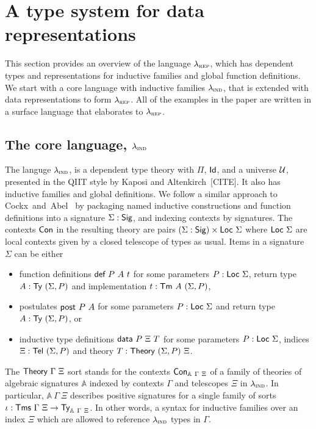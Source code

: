 \section{A type system for data representations}\label{sec:type-system}

This section provides an overview of the language $\lambda_{\textsc{rep}}$, which has
dependent types and representations for inductive families and global function
definitions. We start with a core language with inductive families $\lambda_{\textsc{ind}}$,
that is extended with data representations to form $\lambda_{\textsc{rep}}$. All of the
examples in the paper are written in a surface language that elaborates to
$\lambda_{\textsc{rep}}$.

\subsection{The core language, $\lambda_{\textsc{ind}}$}

The languge $\lambda_{\textsc{ind}}$, is a dependent type theory with $\Pi$, $\textsf{Id}$, and
a universe $\mathcal{U}$, presented in the QIIT style by Kaposi and Altenkirch~[CITE].
It also has inductive families and global definitions. We follow a similar
approach to Cockx~and~Abel~\cite{Cockx2018-fk} by packaging named inductive
constructions and function definitions into a signature $\Sigma : \textsf{Sig}$, and
indexing contexts by signatures. The contexts $\textsf{Con}$ in the resulting theory are
pairs $(\Sigma : \textsf{Sig}) \times \textsf{Loc}\ \Sigma$ where $\Loc\ \Sigma$ are local
contexts given by a closed telescope of types as usual. Items in a signature
$\Sigma$ can be either

\begin{itemize}
  \item function definitions $\mta{def}\ P\ A\ t$ for some parameters $P : \textsf{Loc}\
    \Sigma$, return type $A : \Ty\ (\Sigma, P)$ and implementation $t : \textsf{Tm}\ A\ (\Sigma, P)$,
  \item postulates $\textsf{post}\ P\ A$ for some parameters $P : \textsf{Loc}\
    \Sigma$ and return type $A : \Ty\ (\Sigma, P)$, or
  \item inductive type definitions $\mta{data}\ P\ \Xi\ T$ for some parameters $P : \textsf{Loc}\
    \Sigma$, indices $\Xi : \Tel\ (\Sigma, P)$ and theory $T : \Theory\ (\Sigma, P)\ \Xi$.
\end{itemize}

The $\textsf{Theory}\ \Gamma\ \Xi$ sort stands for the contexts $\textsf{Con}_{\mathbb{A}\
\Gamma\ \Xi}$ of a family of theories of algebraic signatures $\mathbb{A}$
indexed by contexts $\Gamma$ and telescopes $\Xi$ in $\lambda_{\textsc{ind}}$. In
particular, $\mathbb{A}\ \Gamma\ \Xi$ describes positive signatures for a single
family of sorts $\iota : \Tms\ \Gamma\ \Xi \to \Ty_{\mathbb{A}\ \Gamma\ \Xi}$.
In other words, a syntax for inductive families over an index $\Xi$ which are
allowed to reference $\lambda_{\textsc{ind}}$ types in $\Gamma$.


